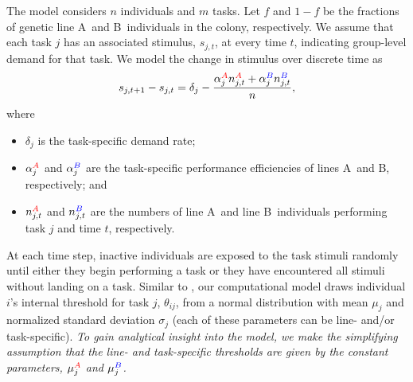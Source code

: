 \documentclass[10pt]{article}
\newcommand{\A}{{\color{red}A}}
\newcommand{\B}{{\color{blue}B}}
\begin{document}
The model considers $n$ individuals and $m$ tasks. 
{\color{orange}Let $f$ and $1-f$ be the fractions of genetic line \A\ and \B\ individuals in the colony, respectively.}
We assume that each task $j$ has an associated stimulus, $s_{j,t}$, at every time $t$, indicating group-level demand for that task. We model the change in stimulus over discrete time as
\begin{equation}
    s_{j,t+1} - s_{j,t} = \delta_j - \frac{\alpha_j^{\A} n_{j,t}^{\A} + \alpha_j^{\B} n_{j,t}^{\B} }{n}, \label{eq:stim}
\end{equation}
where 
\begin{itemize}
    \item $\delta_j$ is the task-specific demand rate;
    \item $\alpha_j^{\A}$ and $\alpha_j^{\B}$ are the task-specific performance efficiencies of lines \A\ and \B, respectively; and
    \item $n_{j,t}^{\A}$ and $n_{j,t}^{\B}$ are the numbers of line \A\ and line \B\ individuals performing task $j$ and time $t$, respectively.
\end{itemize}

At each time step, inactive individuals are exposed to the task stimuli randomly until either they begin performing a task or they have encountered all stimuli without landing on a task. Similar to \cite{ulrich18}, our computational model draws individual $i$'s internal threshold for task $j$, $\theta_{ij}$, from a normal distribution with mean $\mu_j$ and normalized standard deviation $\sigma_j$ (each of these parameters can be line- and/or task-specific). \textit{To gain analytical insight into the model, we make the simplifying assumption that the line- and task-specific thresholds are given by the constant parameters, $\mu_j^{\A}$ and $\mu_j^{\B}$.}
\end{document}
